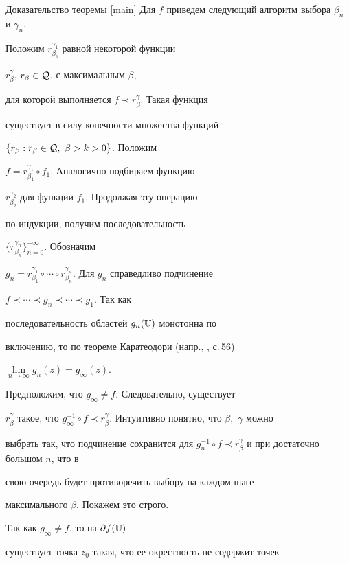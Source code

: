 \begin{pf*}{Доказательство теоремы \ref{main}}
Для $f$ приведем следующий алгоритм выбора $\beta_n$ и $\gamma_n$.


Положим $r_{\beta_1}^{\gamma_1}$ равной некоторой функции


$r_{\beta}^{\gamma}$, $r_{\beta}\in\cal Q$, с максимальным $\beta$,


для которой выполняется $f\prec r_{\beta}^{\gamma}$. Такая функция


существует в силу конечности множества функций


$\{r_\beta:r_\beta\in{\cal Q},\ \beta>k>0\}$. Положим


$f=r_{\beta_1}^{\gamma_1}\circ f_1$. Аналогично подбираем функцию


$r_{\beta_2}^{\gamma_2}$ для функции $f_1$. Продолжая эту операцию


по индукции, получим последовательность


$\{r_{\beta_n}^{\gamma_n}\}_{n=0}^{+\infty}$. Обозначим


$g_n=r_{\beta_1}^{\gamma_1}\circ \dotsb\circ


r_{\beta_n}^{\gamma_n}$. Для $g_n$ справедливо подчинение


$f\prec\dotsb\prec g_n\prec\dotsb\prec g_1$. Так как


последовательность областей $g_n(\Bbb U)$ монотонна по


включению, то по теореме Каратеодори (напр., \cite{Goluzin}, с.\,56)


$\lim\limits_{n\to\infty}g_n(z)=g_\infty(z)$.





Предположим, что $g_\infty\neq f$. Следовательно, существует


$r_{\beta}^{\gamma}$ такое, что $g_\infty^{-1}\circ f\prec


r_{\beta}^{\gamma}$. Интуитивно понятно, что $\beta$,~$\gamma$ можно


выбрать так, что подчинение сохранится для $g_{n}^{-1}\circ


f\prec r_{\beta}^{\gamma}$ и при достаточно большом $n$, что в


свою очередь будет противоречить выбору на каждом шаге


максимального $\beta$. Покажем это строго.





Так как $g_\infty\neq f$, то на $\partial f(\Bbb U)$


существует точка $z_0$ такая, что ее окрестность не содержит точек



\end{pf*}
